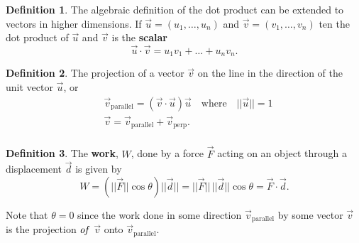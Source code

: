 \documentclass[12pt, a4paper]{article}
\theoremstyle{plain}
\theoremstyle{definition}
\newtheorem{definition}{Definition}[section]
\theoremstyle{remark}
\begin{document}
\begin{definition}
The algebraic definition of the dot product can be extended to vectors in higher dimensions. If $\vec{u} = (u_1, \ldots , u_n)$ and $\vec{v} = (v_1, \ldots , v_n)$ ten the dot product of $\vec{u}$ and $\vec{v}$ is the \textbf{scalar}
$$ \vec{u} \cdot \vec{v} = u_1v_1 + \ldots + u_nv_n.$$
\end{definition}

\begin{definition}
The projection of a vector $\vec{v}$ on the line in the direction of the unit vector $\vec{u}$, or 
\begin{align*}
&\vec{v}_{\text{parallel}} = (\vec{v} \cdot \vec{u})\vec{u} \quad \text{where} \quad ||\vec{u}|| = 1 \\
&\vec{v} = \vec{v}_{\text{parallel}} + \vec{v}_{\text{perp}}. \\
\end{align*}
\end{definition}



\begin{center}
\end{center}



\begin{definition}
The \textbf{work}, $W$, done by a force $\vec{F}$ acting on an object through a displacement $\vec{d}$ is given by 
$$ W = (||\vec{F}|| \cos \theta) ||\vec{d}|| = ||\vec{F}|| \, ||\vec{d}|| \cos \theta = \vec{F} \cdot \vec{d}.$$

Note that $\theta = 0$ since the work done in some direction $\vec{v}_{\text{parallel}}$ by some vector $\vec{v}$ is the projection $\it{of}$ $\vec{v}$ onto $\vec{v}_{\text{parallel}}$.

\end{definition}
\end{document}
